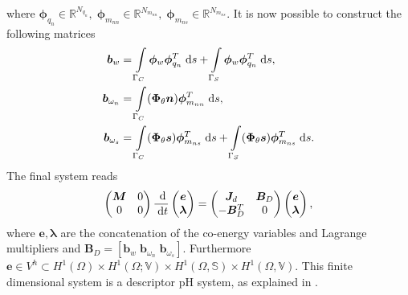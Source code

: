 \documentclass{ifacconf}
\begin{document}
where $\bm{\phi}_{q_n} \in \mathbb{R}^{N_{q_n}}, \; \bm{\phi}_{m_{nn}} \in \mathbb{R}^{N_{m_{nn}}}, \; \bm{\phi}_{m_{ns}} \in \mathbb{R}^{N_{m_{ns}}}$.
It is now possible to construct the following matrices
\begin{equation}
\begin{aligned}
\bm{b}_{w} &= \int_{\Gamma_{C} } \bm{\phi}_{w} \bm{\phi}^T_{q_n} \d{s} + \int_{\Gamma_{S} } \bm{\phi}_{w} \bm{\phi}^T_{q_n} \d{s},\\
\bm{b}_{\omega_n} &= \int_{\Gamma_{C}} (\bm{\Phi}_{\theta} \bm{n}) \bm{\phi}^T_{m_{nn}} \d{s},\\
\bm{b}_{\omega_s} &= \int_{\Gamma_{C}} (\bm{\Phi}_{\theta} \bm{s}) \bm{\phi}^T_{m_{ns}} \d{s} + \int_{\Gamma_{S}} (\bm{\Phi}_{\theta} \bm{s}) \bm{\phi}^T_{m_{ns}} \d{s}.\\
\end{aligned}  
\end{equation}
The final system reads
\begin{equation}
\begin{pmatrix}
\bm{M} & 0 \\
0      & 0 \\
\end{pmatrix} \frac{\d}{\d t}
\begin{pmatrix}
\bm{e}\\
\bm{\lambda} \\
\end{pmatrix}
= \begin{pmatrix}
\bm{J}_d & \bm{B}_D\\
-\bm{B}_D^T & 0 \\
\end{pmatrix}
\begin{pmatrix}
\bm{e}\\
\bm{\lambda} \\
\end{pmatrix},
\end{equation}
where $\bm{e}, \bm{\lambda}$ are the concatenation of the co-energy variables and Lagrange multipliers and $\bm{B}_D = [\bm{b}_{w} \; \bm{b}_{\omega_n} \; \bm{b}_{\omega_s}]$. Furthermore $\bm{e} \in V^h \subset H^1(\Omega) \times H^1(\Omega; \mathbb{V}) \times H^1(\Omega, \mathbb{S}) \times H^1(\Omega, \mathbb{V})$. This finite dimensional system is a descriptor pH system, as explained in \cite{beattie2018linear}.
\end{document}
